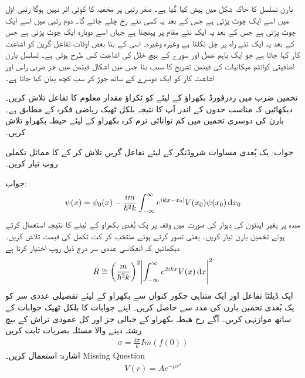 بارن تسلسل کا خاکہ شکل   میں پیش کیا گیا ہے۔ صفر رتبی  پر مخفیہ کا کوئی اثر نہیں ہوگا رتبی اوّل میں اسے ایک چوٹ پڑتی ہے جس کے بعد یہ کسی نئے رخ چلے جائے گا۔ دوم رتبی میں اسے ایک چوٹ پڑتی ہے جس کے بعد یہ ایک نئے مقام پر پہنچتا ہے جہاں اسے دوبارہ ایک چوٹ پڑتی ہے جس کے بعد یہ ایک نئے راہ پر چل نکلتا ہے وغیرہ وغیرہ۔ اسی کے بنا بعض اوقات تفاعل گرین کو اشاعت کار کہا جاتا ہے جو ایک باہم عمل اور سورے کے بیچ خلل کی اشاعت کس طرح ہوتی ہے۔ تسلسل بارن اضافیتی کوانٹم میکانیات کی فینمن تشریح کا سبب بنا جس میں اشکال فینمن میں جز ضربی راس  اور اشاعت کار  کو ایک دوسرے کے ساتھ جوڑ کر سب کچھ بیان کیا جاتا ہے۔

تخمین ضرب میں ردرفورڈ بکھراؤ کے لیئے  کو ٹکراؤ مقدار معلوم کا تفاعل تلاش کریں۔ دیکھائیں کہ مناسب حدوں کے اندر آپ کا نتیجہ بلکل ٹھیک ریاضی فکرہ  کے مطابق ہے۔
بارن کی دوسری تخمین میں کم توانائی نرم کرہ بکھراو کے لیئے حیطہ بکھراو تلاش کریں۔

جواب: 
یک بُعدی مساوات شروڈنگر کے لیئے تفاعل گریں تلاش کر کے  کا مماثل تکملی روپ تیار کریں۔

جواب:
\begin{align}
	\psi(x)=\psi_0(x)-\frac{im}{\hslash^2k}\int_{-\infty}^{\infty}e^{ik\abs{x-x_0}}V(x_0)\psi(x_0)\dif x_0
\end{align}
مبدہ پر بغیر اینٹون کی دیوار کی صورت میں وقفہ  پر یک بُعدی بکھراو کے لیئے  کا نتیجہ استعمال کرتے ہوئے تخمین بارن تیار کریں۔ یعنی  تصور کرتے ہوئے  منتخب کر کت تکمل کی قیمت تلاش کریں۔ دیکھائیں کہ انعکاسی عددی سر درج ذیل روپ اختیار کرتا ہے
\begin{align}
	R\cong\left(\frac{m}{\hslash^2k}\right)^2\abs{\int_{-\infty}^{\infty}e^{2ikx}V(x)\dif x}^2
\end{align}
ایک ڈیلٹا تفاعل  اور ایک متناہی چکور کنواں  سے بکھراو کے لیئے تفصیلی عددی سر  کو یک بُعدی تخمین بارن  کی مدد سے حاصل کریں۔ اپنے جوابات کا بلکل ٹھیک جوابات  کے ساتھ موازنہی کریں۔
آگے رخ ھیطہ بکھراو کے خیالی جز اور کل عمودی تراش کے بیچ رشتہ دینے والا مسئلہ بصریات ثابت کریں 
\begin{align}
	\sigma = \frac{4\pi}{k}Im(f(0))
\end{align}
اشارہ:  استعمال کریں۔
Missing Question
\begin{align}
	V(r) = Ae^{-\mu r^2}
\end{align}

